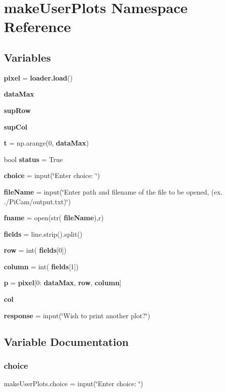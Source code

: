 \section{make\+User\+Plots Namespace Reference}
\label{namespacemake_user_plots}
\subsection*{Variables}
\begin{DoxyCompactItemize}
\item 
\textbf{ pixel} = \textbf{ loader.\+load}()
\item 
\textbf{ data\+Max}
\item 
\textbf{ sup\+Row}
\item 
\textbf{ sup\+Col}
\item 
\textbf{ t} = np.\+arange(0,\textbf{ data\+Max})
\item 
bool \textbf{ status} = True
\item 
\textbf{ choice} = input(\char`\"{}Enter choice\+: \char`\"{})
\item 
\textbf{ file\+Name} = input(\char`\"{}Enter path and filename of the file to be opened, (ex. \textquotesingle{}./Pi\+Cam/output.\+txt\textquotesingle{})\char`\"{})
\item 
\textbf{ fname} = open(str(\textbf{ file\+Name}),\textquotesingle{}r\textquotesingle{})
\item 
\textbf{ fields} = line.\+strip().split()
\item 
\textbf{ row} = int(\textbf{ fields}[0])
\item 
\textbf{ column} = int(\textbf{ fields}[1])
\item 
\textbf{ p} = \textbf{ pixel}[0\+:\textbf{ data\+Max}, \textbf{ row}, \textbf{ column}]
\item 
\textbf{ col}
\item 
\textbf{ response} = input(\char`\"{}Wish to print another plot?\char`\"{})
\end{DoxyCompactItemize}


\subsection{Variable Documentation}
\mbox{\label{namespacemake_user_plots_af1332128930e280c0f97a62b836de58d}} 
\subsubsection{choice}
{\footnotesize\ttfamily make\+User\+Plots.\+choice = input(\char`\"{}Enter choice\+: \char`\"{})}



